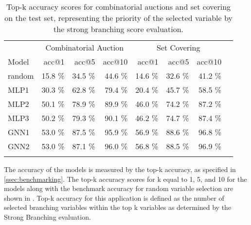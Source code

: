 \begin{scriptsize}
\begin{table}[ht]
	\centering
	\begin{tabular}{lrrrrrrr}
		\toprule
		& \multicolumn{3}{c}{Combinatorial Auction} & \multicolumn{3}{c}{Set Covering}\\ 
		\cmidrule(lr){2-4} \cmidrule(lr){5-7}
		Model & acc@1 & acc@5 & acc@10 & acc@1 & acc@5 & acc@10 \\
		\midrule
		random & 15.8 \% & 34.5 \% & 44.6 \% & 14.6 \% & 32.6 \% & 41.2 \%\\
		MLP1 & 30.3 \% & 62.8 \% & 79.4 \% & 20.4 \% & 45.7 \% & 58.5 \%\\
		MLP2 & 50.1 \% & 78.9 \% & 89.9 \% & 46.0 \% & 74.2 \% & 87.2 \%\\
		MLP3 & 50.2 \% & 79.3 \% & 90.1 \% & 46.2 \% & 74.7 \% & 87.4 \%\\
		GNN1 & 53.0 \% & 87.5 \% & 95.9 \% & 56.9 \% & 88.6 \% & 96.8 \%\\
		GNN2 & 53.0 \% & 87.1 \% & 96.0 \% & 56.8 \% & 88.5 \% & 96.9 \%\\
		\addlinespace
		\bottomrule
	\end{tabular}
	\caption{Top-k accuracy scores for combinatorial auctions and set covering on the test set, representing the priority of the selected variable by the strong branching score evaluation.}\label{tab:accs}
\end{table}
\end{scriptsize}

 
The accuracy of the models is measured by the top-k accuracy, as specified in \cref{ssec:benchmarking}.
The top-k accuracy scores for k equal to 1, 5, and 10 for the models along with the benchmark accuracy for random variable selection are shown in . Top-k accuracy for this application is defined as the number of selected branching variables within the top k variables as determined by the Strong Branching evaluation. 

